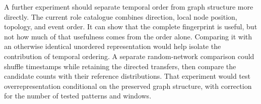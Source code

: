 A further experiment should separate temporal order from graph structure more
directly. The current role catalogue combines direction, local node position,
topology, and event order. It can show that the complete fingerprint is useful,
but not how much of that usefulness comes from the order alone. Comparing it
with an otherwise identical unordered representation would help isolate the
contribution of temporal ordering. A separate random-network comparison could
shuffle timestamps while retaining the directed transfers, then compare the
candidate counts with their reference distributions. That experiment would test
overrepresentation conditional on the preserved graph structure, with correction
for the number of tested patterns and windows.

